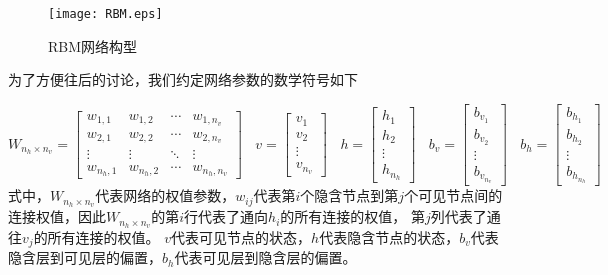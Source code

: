 \begin{figure}[!htbp]
\centering
\texttt{[image: RBM.eps]}
\caption{RBM网络构型}
\label{img:RBM}
\end{figure}

为了方便往后的讨论，我们约定网络参数的数学符号如下

\begin{equation}
W_{n_h \times n_v } = \left[               %
\begin{array}{cccc}  
w_{1,1} & w_{1,2} &\cdots & w_{1, n_v}\\  
w_{2,1} & w_{2,2} &\cdots & w_{2, n_v}\\
\vdots  & \vdots & \ddots  & \vdots\\
w_{n_h, 1} & w_{n_h, 2} & \cdots & w_{n_h, n_v}
\end{array}
\right]~~~~%
v = \left[   
\begin{array}{cccc}  
v_1\\  
v_2\\
\vdots\\
v_{n_v}
\end{array}
\right]~~~~%
h = \left[   
\begin{array}{cccc}  
h_1\\  
h_2\\
\vdots\\
h_{n_h}
\end{array}
\right]~~~~%
b_v = \left[   
\begin{array}{cccc}  
b_{v_1}\\  
b_{v_2}\\
\vdots\\
b_{v_{n_v}}
\end{array}
\right]~~~~%
b_h = \left[   
\begin{array}{cccc}  
b_{h_1}\\  
b_{h_2}\\
\vdots\\
b_{h_{n_h}}
\end{array}
\right]
\end{equation}
式中，$W_{n_h \times n_v }$代表网络的权值参数，$w_{ij}$代表第$i$个隐含节点到第$j$个可见节点间的连接权值，因此$W_{n_h \times n_v }$的第$i$行代表了通向$h_i$的所有连接的权值， 第$j$列代表了通往$v_j$的所有连接的权值。 $v$代表可见节点的状态，$h$代表隐含节点的状态，$b_v$代表隐含层到可见层的偏置，$b_h$代表可见层到隐含层的偏置。

